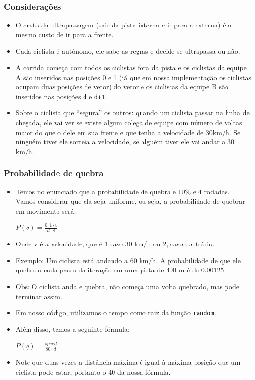 \documentclass{beamer}
\begin{document}
\begin{frame}
\frametitle{Considerações}
\begin{itemize}
	\item O custo da ultrapassagem (sair da pista interna e ir para a externa) é o mesmo custo de ir para a frente.
	\item Cada ciclista é autônomo, ele sabe as regras e decide se ultrapassa ou não.
	\item A corrida começa com todos os ciclistas fora da pista e os ciclistas da equipe A são inseridos nas posições 0 e 1 (já que em nossa implementação os ciclistas ocupam duas posições de vetor) do vetor e os ciclistas da equipe B são inseridos nas posições \texttt{d} e \texttt{d+1}.
	\item Sobre o ciclista que “segura” os outros:  quando um ciclista passar na linha de chegada, ele vai ver se existe algum colega de equipe com número de voltas maior do que o dele em sua frente e que tenha a velocidade de 30km/h.  Se ninguém tiver ele sorteia a velocidade, se alguém tiver ele vai andar a 30 km/h.
	
\end{itemize}
\end{frame}

\begin{frame}
	\frametitle{Probabilidade de quebra}
	\begin{itemize}
		\item Temos no enunciado que a probabilidade de quebra é 10\% e 4 rodadas. 
		Vamos considerar que ela seja uniforme, ou seja, a probabilidade de quebrar em movimento será: \\
		\begin{center} 
			$P(q) = \frac{0,1 \cdot v}{d \cdot 8}$
		\end{center}
		\item Onde v é a velocidade, que é 1 caso 30 km/h ou 2, caso contrário.
		\item Exemplo: Um ciclista está andando a 60 km/h. A probabilidade de que ele quebre a cada passo da iteração em uma pista de 400 m é de 0.00125.
		\item Obs: O ciclista anda e quebra, não começa uma volta quebrado, mas pode terminar assim. 
		
	\end{itemize}
\end{frame}

\begin{frame}
	\begin{itemize}
		\item Em nosso código, utilizamos o tempo como raiz da função \texttt{random}.
		\item Além disso, temos a seguinte fórmula:
		\begin{center} 
			$P(q) = \frac{speed}{80 \cdot d}$
		\end{center}
		\item Note que duas vezes a distância máxima é igual à máxima posição que um ciclista pode estar, portanto o 40 da nossa fórmula.
	\end{itemize}
\end{frame}
\end{document}
